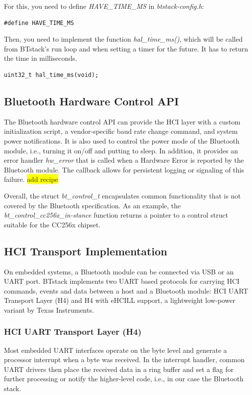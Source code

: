 \documentclass[a4paper,titlepage,oneside,12pt]{amsart} %
\newcommand{\todo}[1]{\colorbox{yellow}{#1}}
\begin{document}
For this, you need to define \emph{HAVE\_TIME\_MS} in \emph{btstack-config.h}:
\begin{lstlisting}
#define HAVE_TIME_MS
\end{lstlisting}

Then, you need to implement the function \emph{hal\_time\_ms()}, which will be called from BTstack's run loop and when setting a timer for the future. It has to return the time in milliseconds.

\begin{lstlisting}
uint32_t hal_time_ms(void);
\end{lstlisting}

\subsection{Bluetooth Hardware Control API}
\label{section:bt_hw_control}
The Bluetooth hardware control API can provide the HCI layer with a custom initialization script, a vendor-specific baud rate change command, and system power notifications. It is also used to control the power mode of the Bluetooth module, i.e., turning it on/off and putting to sleep. In addition, it provides an error handler \emph{hw\_error} that is called when a Hardware Error is reported by the Bluetooth module. The callback allows for persistent logging or signaling of this failure. \todo{add recipe}

Overall, the struct \emph{bt\_control\_t} encapsulates common functionality that is not covered by the Bluetooth specification. As an example, the \emph{bt\_control\_cc256x\_in-stance} function returns a pointer to a control struct suitable for the CC256x chipset.

 \subsection{HCI Transport Implementation}
 \label{section:hci_transport}
On embedded systems, a Bluetooth module can be connected via USB or an UART port. BTstack implements two UART based protocols for carrying HCI commands, events and data between a host and a Bluetooth module: HCI UART Transport Layer (H4) and H4 with eHCILL support, a lightweight low-power variant by Texas Instruments.

 \subsubsection{HCI UART Transport Layer (H4)}
 \label{section:hciUART}
Most embedded UART interfaces operate on the byte level and generate a processor interrupt when a byte was received. In the interrupt handler, common UART drivers then place the received data in a ring buffer and set a flag for further processing or notify the higher-level code, i.e., in our case the Bluetooth stack.
\end{document}

